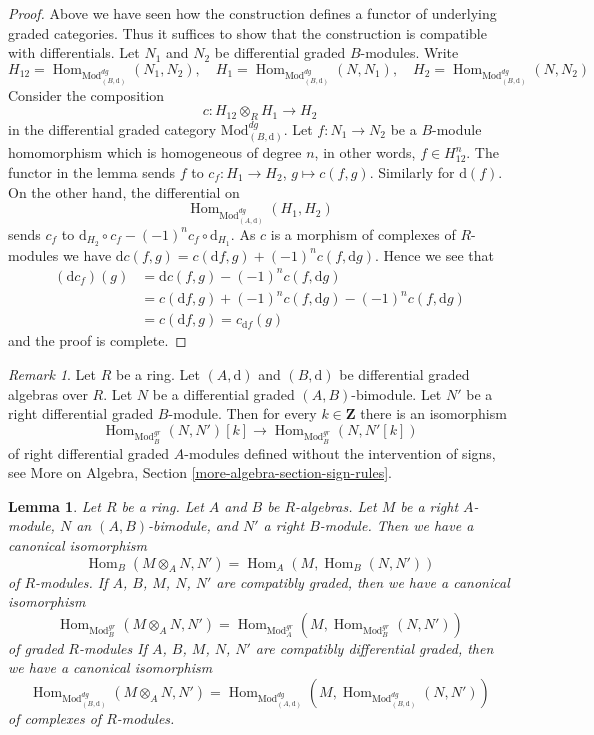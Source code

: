 \documentclass{stacks-project}
\theoremstyle{plain}
\newtheorem{lemma}[subsection]{Lemma}
\theoremstyle{definition}
\theoremstyle{remark}
\newtheorem{remark}[subsection]{Remark}
\numberwithin{equation}{subsection}
\def\Hom{\mathop{\mathrm{Hom}}\nolimits}
\begin{document}
\begin{proof}
Above we have seen how the construction defines a functor of underlying
graded categories. Thus it suffices to show that the construction is
compatible with differentials. Let $N_1$ and $N_2$ be differential
graded $B$-modules. Write
$$
H_{12} = \Hom_{\text{Mod}^{dg}_{(B, \text{d})}}(N_1, N_2),\quad
H_1 = \Hom_{\text{Mod}^{dg}_{(B, \text{d})}}(N, N_1),\quad
H_2 = \Hom_{\text{Mod}^{dg}_{(B, \text{d})}}(N, N_2)
$$
Consider the composition
$$
c : H_{12} \otimes_R H_1 \longrightarrow H_2
$$
in the differential graded category $\text{Mod}^{dg}_{(B, \text{d})}$.
Let $f : N_1 \to N_2$ be a $B$-module homomorphism which is homogeneous
of degree $n$, in other words, $f \in H_{12}^n$.
The functor in the lemma sends $f$ to $c_f : H_1 \to H_2$, $g \mapsto c(f, g)$.
Similarly for $\text{d}(f)$. On the other hand, the differential on
$$
\Hom_{\text{Mod}^{dg}_{(A, \text{d})}}(H_1, H_2)
$$
sends $c_f$ to $\text{d}_{H_2} \circ c_f - (-1)^n c_f \circ \text{d}_{H_1}$.
As $c$ is a morphism of complexes of $R$-modules we have
$\text{d} c(f, g) = c(\text{d}f, g) + (-1)^n c(f, \text{d}g)$.
Hence we see that
\begin{align*}
(\text{d}c_f)(g)
& =
\text{d}c(f,g) - (-1)^n c(f, \text{d}g) \\
& =
c(\text{d}f, g) + (-1)^n c(f, \text{d}g)  - (-1)^n c(f, \text{d}g) \\
& =
c(\text{d}f, g) = c_{\text{d}f}(g)
\end{align*}
and the proof is complete.
\end{proof}

\begin{remark}
\label{remark-shift-hom-no-sign}
Let $R$ be a ring. Let $(A, \text{d})$ and $(B, \text{d})$
be differential graded algebras over $R$. Let $N$ be a
differential graded $(A, B)$-bimodule. Let $N'$ be a right differential
graded $B$-module. Then for every $k \in \mathbf{Z}$ there
is an isomorphism
$$
\Hom_{\text{Mod}^{gr}_B}(N, N')[k]
\longrightarrow
\Hom_{\text{Mod}^{gr}_B}(N, N'[k])
$$
of right differential graded $A$-modules defined without the intervention
of signs, see More on Algebra, Section \ref{more-algebra-section-sign-rules}.
\end{remark}

\begin{lemma}
\label{lemma-tensor-hom-adjunction}
Let $R$ be a ring. Let $A$ and $B$ be $R$-algebras.
Let $M$ be a right $A$-module, $N$ an $(A, B)$-bimodule, and
$N'$ a right $B$-module. Then we have a canonical isomorphism
$$
\Hom_B(M \otimes_A N, N') = \Hom_A(M, \Hom_B(N, N'))
$$
of $R$-modules.
If $A$, $B$, $M$, $N$, $N'$ are compatibly graded, then we have a
canonical isomorphism
$$
\Hom_{\text{Mod}_B^{gr}}(M \otimes_A N, N') =
\Hom_{\text{Mod}_A^{gr}}(M, \Hom_{\text{Mod}_B^{gr}}(N, N'))
$$
of graded $R$-modules
If $A$, $B$, $M$, $N$, $N'$ are compatibly differential graded, then
we have a canonical isomorphism
$$
\Hom_{\text{Mod}^{dg}_{(B, \text{d})}}(M \otimes_A N, N') =
\Hom_{\text{Mod}^{dg}_{(A, \text{d})}}(M,
\Hom_{\text{Mod}^{dg}_{(B, \text{d})}}(N, N'))
$$
of complexes of $R$-modules.
\end{lemma}
\end{document}
